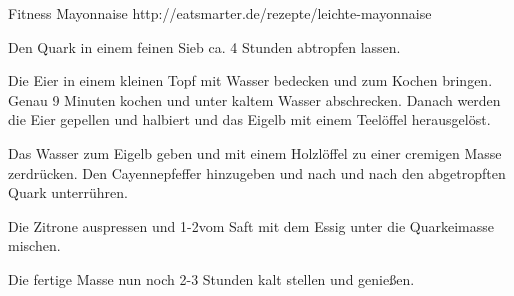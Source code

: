 \begin{recipe}[]{ Fitness Mayonnaise }{ http://eatsmarter.de/rezepte/leichte-mayonnaise }{  }



\step
Den Quark in einem feinen Sieb ca. 4 Stunden abtropfen lassen.

\step
Die Eier in einem kleinen Topf mit Wasser bedecken und zum Kochen bringen. Genau 9 Minuten kochen und unter kaltem Wasser abschrecken. Danach werden die Eier gepellen und halbiert und das Eigelb mit einem Teelöffel herausgelöst.  


\step
Das Wasser zum Eigelb geben und mit einem Holzlöffel zu einer cremigen Masse zerdrücken. Den Cayennepfeffer hinzugeben und nach und nach den abgetropften Quark unterrühren.

\step
Die Zitrone auspressen und 1-2\TL vom Saft mit dem Essig unter die Quarkeimasse mischen. 

\step 
Die fertige Masse nun noch 2-3 Stunden kalt stellen und genießen.


\end{recipe}